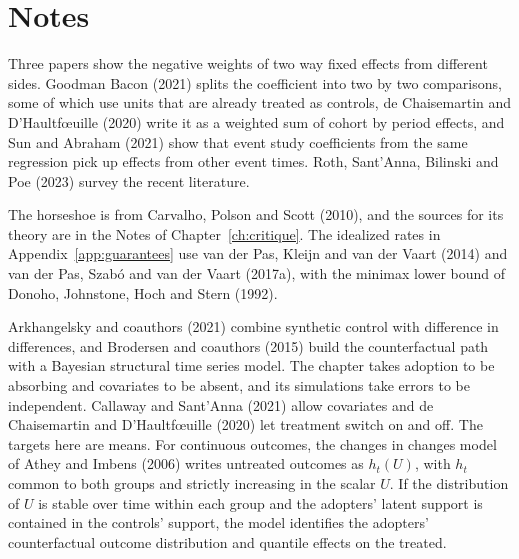 \section*{Notes}

Three papers show the negative weights of two way fixed effects from different sides. Goodman Bacon (2021) splits the coefficient into two by two comparisons, some of which use units that are already treated as controls, de Chaisemartin and D'Haultf\oe uille (2020) write it as a weighted sum of cohort by period effects, and Sun and Abraham (2021) show that event study coefficients from the same regression pick up effects from other event times. Roth, Sant'Anna, Bilinski and Poe (2023) survey the recent literature.

The horseshoe is from Carvalho, Polson and Scott (2010), and the sources for its theory are in the Notes of Chapter~\ref{ch:critique}. The idealized rates in Appendix~\ref{app:guarantees} use van der Pas, Kleijn and van der Vaart (2014) and van der Pas, Szab\'o and van der Vaart (2017a), with the minimax lower bound of Donoho, Johnstone, Hoch and Stern (1992).

Arkhangelsky and coauthors (2021) combine synthetic control with difference in differences, and Brodersen and coauthors (2015) build the counterfactual path with a Bayesian structural time series model. The chapter takes adoption to be absorbing and covariates to be absent, and its simulations take errors to be independent. Callaway and Sant'Anna (2021) allow covariates and de Chaisemartin and D'Haultf\oe uille (2020) let treatment switch on and off. The targets here are means. For continuous outcomes, the changes in changes model of Athey and Imbens (2006) writes untreated outcomes as $h_t(U)$, with $h_t$ common to both groups and strictly increasing in the scalar $U$. If the distribution of $U$ is stable over time within each group and the adopters' latent support is contained in the controls' support, the model identifies the adopters' counterfactual outcome distribution and quantile effects on the treated.

